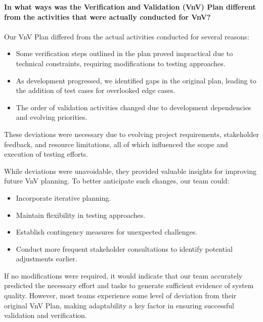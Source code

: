 \documentclass[12pt, titlepage]{article}
\begin{document}
  \newline \textbf{In what ways was the Verification and Validation (VnV) Plan different from the activities that were actually conducted for VnV?} \\\\
  Our VnV Plan differed from the actual activities conducted for several reasons:
  \begin{itemize}
      \item Some verification steps outlined in the plan proved impractical due to technical constraints, requiring modifications to testing approaches.
      \item As development progressed, we identified gaps in the original plan, leading to the addition of test cases for overlooked edge cases.
      \item The order of validation activities changed due to development dependencies and evolving priorities.
  \end{itemize}
  
  \noindent These deviations were necessary due to evolving project requirements, stakeholder feedback, and resource limitations, all of which influenced the scope and execution of testing efforts.
  
  \noindent While deviations were unavoidable, they provided valuable insights for improving future VnV planning. To better anticipate such changes, our team could:
  \begin{itemize}
      \item Incorporate iterative planning.
      \item Maintain flexibility in testing approaches.
      \item Establish contingency measures for unexpected challenges.
      \item Conduct more frequent stakeholder consultations to identify potential adjustments earlier.
  \end{itemize}
  
  \noindent If no modifications were required, it would indicate that our team accurately predicted the necessary effort and tasks to generate sufficient evidence of system quality. However, most teams experience some level of deviation from their original VnV Plan, making adaptability a key factor in ensuring successful validation and verification.  
\end{document}
